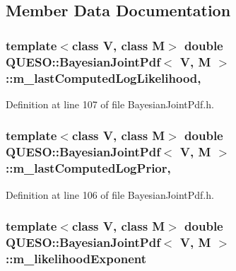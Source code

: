 \subsection{Member Data Documentation}
\hypertarget{class_q_u_e_s_o_1_1_bayesian_joint_pdf_af97f3ff0d65154366e31d14fd88ccb38}{
\subsubsection[{m\-\_\-last\-Computed\-Log\-Likelihood}]{\setlength{\rightskip}{0pt plus 5cm}template$<$class V, class M$>$ double {\bf Q\-U\-E\-S\-O\-::\-Bayesian\-Joint\-Pdf}$<$ V, M $>$\-::m\-\_\-last\-Computed\-Log\-Likelihood\hspace{0.3cm}{\ttfamily [mutable]}, {\ttfamily [protected]}}}\label{class_q_u_e_s_o_1_1_bayesian_joint_pdf_af97f3ff0d65154366e31d14fd88ccb38}


Definition at line 107 of file Bayesian\-Joint\-Pdf.\-h.

\hypertarget{class_q_u_e_s_o_1_1_bayesian_joint_pdf_a2b1c5582be60a876a6dd08766e7e31ed}{
\subsubsection[{m\-\_\-last\-Computed\-Log\-Prior}]{\setlength{\rightskip}{0pt plus 5cm}template$<$class V, class M$>$ double {\bf Q\-U\-E\-S\-O\-::\-Bayesian\-Joint\-Pdf}$<$ V, M $>$\-::m\-\_\-last\-Computed\-Log\-Prior\hspace{0.3cm}{\ttfamily [mutable]}, {\ttfamily [protected]}}}\label{class_q_u_e_s_o_1_1_bayesian_joint_pdf_a2b1c5582be60a876a6dd08766e7e31ed}


Definition at line 106 of file Bayesian\-Joint\-Pdf.\-h.

\hypertarget{class_q_u_e_s_o_1_1_bayesian_joint_pdf_a511b1e403ebcab436177491ea8f21c07}{
\subsubsection[{m\-\_\-likelihood\-Exponent}]{\setlength{\rightskip}{0pt plus 5cm}template$<$class V, class M$>$ double {\bf Q\-U\-E\-S\-O\-::\-Bayesian\-Joint\-Pdf}$<$ V, M $>$\-::m\-\_\-likelihood\-Exponent\hspace{0.3cm}{\ttfamily [protected]}}}\label{class_q_u_e_s_o_1_1_bayesian_joint_pdf_a511b1e403ebcab436177491ea8f21c07}


